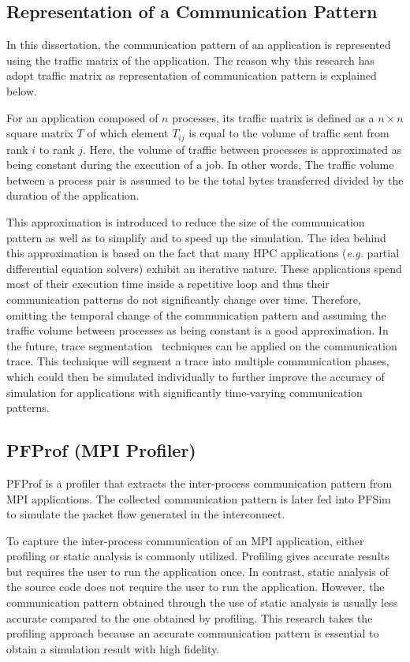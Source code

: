 \subsection{Representation of a Communication Pattern}

In this dissertation, the communication pattern of an application is
represented using the traffic matrix of the application. The reason why this
research has adopt traffic matrix as representation of communication pattern
is explained below.

For an application composed of \(n\) processes, its traffic matrix is defined
as a \(n \times n\) square matrix \(T\) of which element \(T_{ij}\) is equal
to the volume of traffic sent from rank \(i\) to rank \(j\). Here, the volume
of traffic between processes is approximated as being constant during the
execution of a job. In other words, The traffic volume between a process pair
is assumed to be the total bytes transferred divided by the duration of the
application.

This approximation is introduced to reduce the size of the communication
pattern as well as to simplify and to speed up the simulation. The idea behind
this approximation is based on the fact that many HPC applications
(\emph{e.g.} partial differential equation solvers) exhibit an iterative
nature. These applications spend most of their execution time inside a
repetitive loop and thus their communication patterns do not significantly
change over time. Therefore, omitting the temporal change of the communication
pattern and assuming the traffic volume between processes as being constant is
a good approximation. In the future, trace segmentation~\autocite{Alawneh2016}
techniques can be applied on the communication trace. This technique will
segment a trace into multiple communication phases, which could then be
simulated individually to further improve the accuracy of simulation for
applications with significantly time-varying communication patterns.

\subsection{PFProf (MPI Profiler)}\label{sec:ii-pfprof}

PFProf is a profiler that extracts the inter-process communication pattern
from MPI applications. The collected communication pattern is later fed into
PFSim to simulate the packet flow generated in the interconnect.

To capture the inter-process communication of an MPI application, either
profiling or static analysis is commonly utilized. Profiling gives accurate
results but requires the user to run the application once. In contrast, static
analysis of the source code does not require the user to run the application.
However, the communication pattern obtained through the use of static analysis
is usually less accurate compared to the one obtained by profiling. This
research takes the profiling approach because an accurate communication
pattern is essential to obtain a simulation result with high fidelity.

